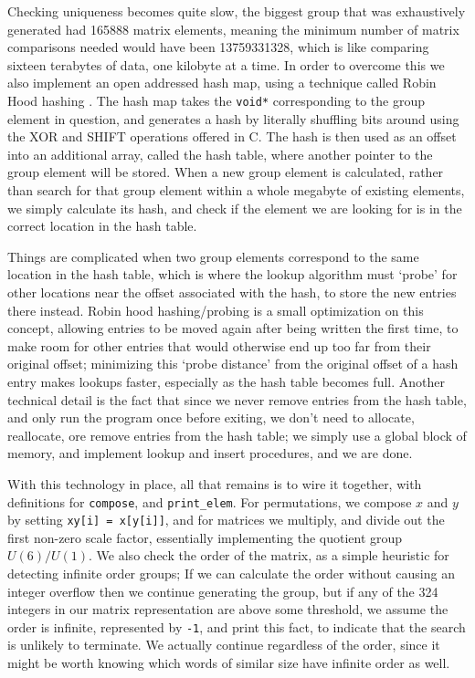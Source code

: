 Checking uniqueness becomes quite slow, the biggest group that was exhaustively generated had 165888 matrix elements, meaning the minimum number of matrix comparisons needed would have been 13759331328, which is like comparing sixteen terabytes of data, one kilobyte at a time. In order to overcome this we also implement an open addressed hash map, using a technique called Robin Hood hashing \cite{robin-hood}. The hash map takes the \verb`void*` corresponding to the group element in question, and generates a hash by literally shuffling bits around using the XOR and SHIFT operations offered in C. The hash is then used as an offset into an additional array, called the hash table, where another pointer to the group element will be stored. When a new group element is calculated, rather than search for that group element within a whole megabyte of existing elements, we simply calculate its hash, and check if the element we are looking for is in the correct location in the hash table.

Things are complicated when two group elements correspond to the same location in the hash table, which is where the lookup algorithm must `probe' for other locations near the offset associated with the hash, to store the new entries there instead. Robin hood hashing/probing is a small optimization on this concept, allowing entries to be moved again after being written the first time, to make room for other entries that would otherwise end up too far from their original offset; minimizing this `probe distance' from the original offset of a hash entry makes lookups faster, especially as the hash table becomes full. Another technical detail is the fact that since we never remove entries from the hash table, and only run the program once before exiting, we don't need to allocate, reallocate, ore remove entries from the hash table; we simply use a global block of memory, and implement lookup and insert procedures, and we are done.

With this technology in place, all that remains is to wire it together, with definitions for \verb`compose`, and \verb`print_elem`. For permutations, we compose $x$ and $y$ by setting \verb`xy[i] = x[y[i]]`, and for matrices we multiply, and divide out the first non-zero scale factor, essentially implementing the quotient group $U(6)/U(1)$. We also check the order of the matrix, as a simple heuristic for detecting infinite order groups; If we can calculate the order without causing an integer overflow then we continue generating the group, but if any of the 324 integers in our matrix representation are above some threshold, we assume the order is infinite, represented by \verb`-1`, and print this fact, to indicate that the search is unlikely to terminate. We actually continue regardless of the order, since it might be worth knowing which words of similar size have infinite order as well.

